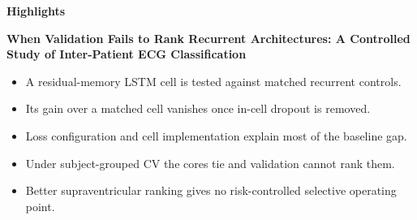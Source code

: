 \documentclass[12pt]{article}
\begin{document}
\noindent\textbf{Highlights}

\medskip
\noindent\textbf{When Validation Fails to Rank Recurrent Architectures: A Controlled Study of Inter-Patient ECG Classification}

\medskip
\begin{itemize}[leftmargin=1.4em,itemsep=4pt]
  \item A residual-memory LSTM cell is tested against matched recurrent controls.
  \item Its gain over a matched cell vanishes once in-cell dropout is removed.
  \item Loss configuration and cell implementation explain most of the baseline gap.
  \item Under subject-grouped CV the cores tie and validation cannot rank them.
  \item Better supraventricular ranking gives no risk-controlled selective operating point.
\end{itemize}
\end{document}
